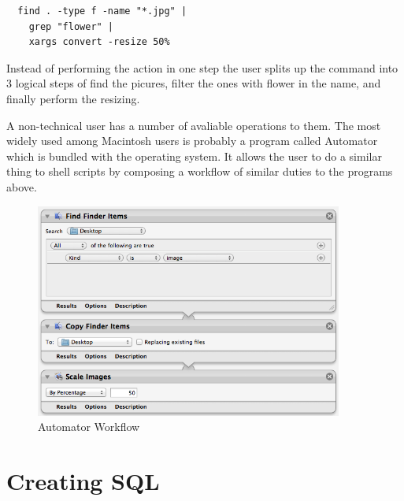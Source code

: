 \begin{verbatim}
  find . -type f -name "*.jpg" |
    grep "flower" |
    xargs convert -resize 50%
\end{verbatim}

Instead of performing the action in one step the user splits up the command into 3 logical steps of find the picures, filter the ones with flower in the name, and finally perform the resizing.

A non-technical user has a number of avaliable operations to them. The most widely used among Macintosh users is probably a program called Automator which is bundled with the operating system. It allows the user to do a similar thing to shell scripts by composing a workflow of similar duties to the programs above.

\begin{figure}[ht!]
	\centering
	\includegraphics[width=0.9\textwidth]{images/automator}
	\caption{Automator Workflow}
	\label{fig:automator}
\end{figure}

\section{Creating SQL}